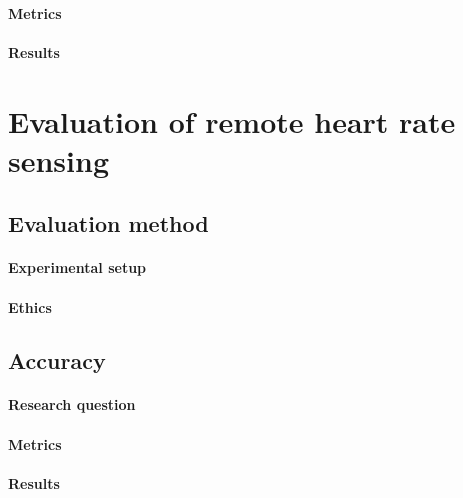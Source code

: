 \paragraph{Metrics}
\paragraph{Results}


\section{Evaluation of remote heart rate sensing}
\subsection{Evaluation method}
\paragraph{Experimental setup}
\paragraph{Ethics}
\subsection{Accuracy}

\paragraph{Research question}
\paragraph{Metrics}
\paragraph{Results}


